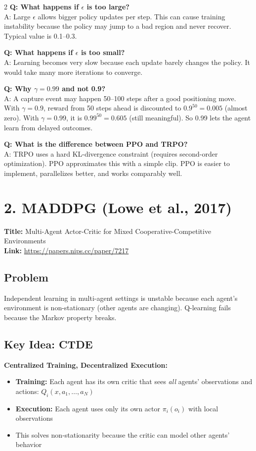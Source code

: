\documentclass[10pt,a4paper]{article}
\begin{document}
\begin{multicols}{2}
\textbf{Q: What happens if $\epsilon$ is too large?} \\
A: Large $\epsilon$ allows bigger policy updates per step. This can cause training instability because the policy may jump to a bad region and never recover. Typical value is 0.1--0.3.

\textbf{Q: What happens if $\epsilon$ is too small?} \\
A: Learning becomes very slow because each update barely changes the policy. It would take many more iterations to converge.

\textbf{Q: Why $\gamma = 0.99$ and not 0.9?} \\
A: A capture event may happen 50--100 steps after a good positioning move. With $\gamma = 0.9$, reward from 50 steps ahead is discounted to $0.9^{50} = 0.005$ (almost zero). With $\gamma = 0.99$, it is $0.99^{50} = 0.605$ (still meaningful). So 0.99 lets the agent learn from delayed outcomes.

\textbf{Q: What is the difference between PPO and TRPO?} \\
A: TRPO uses a hard KL-divergence constraint (requires second-order optimization). PPO approximates this with a simple clip. PPO is easier to implement, parallelizes better, and works comparably well.

\section{2. MADDPG (Lowe et al., 2017)}

\textbf{Title:} Multi-Agent Actor-Critic for Mixed Cooperative-Competitive Environments \\
\textbf{Link:} \url{https://papers.nips.cc/paper/7217}

\subsection{Problem}
Independent learning in multi-agent settings is unstable because each agent's environment is non-stationary (other agents are changing). Q-learning fails because the Markov property breaks.

\subsection{Key Idea: CTDE}
\textbf{Centralized Training, Decentralized Execution:}
\begin{itemize}
\item \textbf{Training:} Each agent has its own critic that sees \textit{all} agents' observations and actions: $Q_i(x, a_1, \ldots, a_N)$
\item \textbf{Execution:} Each agent uses only its own actor $\pi_i(o_i)$ with local observations
\item This solves non-stationarity because the critic can model other agents' behavior
\end{itemize}


\end{multicols}
\end{document}
